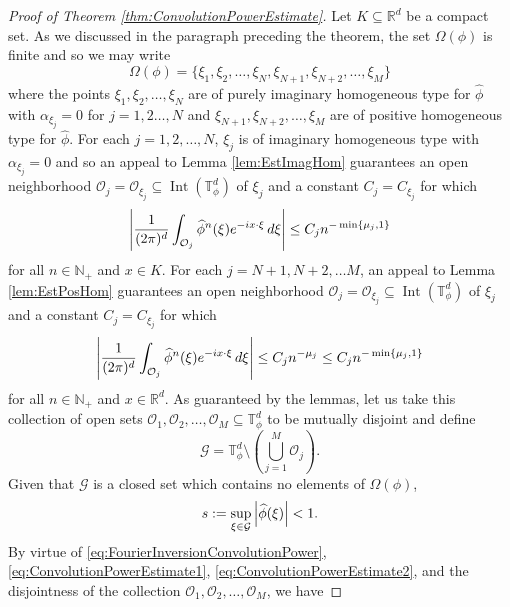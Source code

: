 \documentclass[11pt, letter]{book}
\newcommand\Interior{\operatorname{Int}}
\begin{document}
\begin{proof}[Proof of Theorem \ref{thm:ConvolutionPowerEstimate}]
Let $K\subseteq\mathbb{R}^d$ be a compact set. As we discussed in the paragraph preceding the theorem, the set $\Omega(\phi)$ is finite and so we may write
\begin{equation*}
    \Omega(\phi)=\{\xi_1,\xi_2,\dots,\xi_N,\xi_{N+1},\xi_{N+2},\dots,\xi_M\}
\end{equation*}
where the points $\xi_1,\xi_2,\dots,\xi_N$ are of purely imaginary homogeneous type for $\widehat{\phi}$ with $\alpha_{\xi_j}=0$ for $j=1,2\dots,N$ and $\xi_{N+1},\xi_{N+2},\dots,\xi_M$ are of positive homogeneous type for $\widehat{\phi}$. For each $j=1,2,\dots,N$, $\xi_j$ is of imaginary homogeneous type with $\alpha_{\xi_j}=0$ and so an appeal to Lemma \ref{lem:EstImagHom} guarantees an open neighborhood $\mathcal{O}_j=\mathcal{O}_{\xi_j}\subseteq\Interior(\mathbb{T}_\phi^d)$ of $\xi_j$ and a constant $C_j=C_{\xi_j}$ for which
\begin{equation}\label{eq:ConvolutionPowerEstimate1}
    \abs{\frac{1}{(2\pi)^d}\int_{\mathcal{O}_j}\widehat{\phi}^n(\xi)e^{-ix\cdot\xi}\,d\xi}\leq C_j n^{-\min\{\mu_j,1\}}
\end{equation}
for all $n\in\mathbb{N}_+$ and $x\in K$. For each $j=N+1,N+2,\dots M$, an appeal to Lemma \ref{lem:EstPosHom} guarantees an open neighborhood $\mathcal{O}_j=\mathcal{O}_{\xi_j}\subseteq\Interior(\mathbb{T}_\phi^d)$ of $\xi_j$ and a constant $C_j=C_{\xi_j}$ for which 
\begin{equation}\label{eq:ConvolutionPowerEstimate2}
        \abs{\frac{1}{(2\pi)^d}\int_{\mathcal{O}_j}\widehat{\phi}^n(\xi)e^{-ix\cdot\xi}\,d\xi}\leq C_jn^{-\mu_j}\leq C_j n^{-\min\{\mu_j,1\}}
\end{equation}
for all $n\in\mathbb{N}_+$ and $x\in\mathbb{R}^d$. As guaranteed by the lemmas, let us take this collection of open sets $\mathcal{O}_1,\mathcal{O}_2,\dots,\mathcal{O}_M\subseteq\mathbb{T}_{\phi}^d$ to be mutually disjoint and define
\begin{equation}
    \mathcal{G}=\mathbb{T}_{\phi}^d\setminus\left(\bigcup_{j=1}^M \mathcal{O}_j\right).
\end{equation}
Given that $\mathcal{G}$ is a closed set which contains no elements of $\Omega(\phi)$,
\begin{equation*}
s:=\sup_{\xi\in\mathcal{G}}\abs{\widehat{\phi}(\xi)}<1.
\end{equation*}
By virtue of \eqref{eq:FourierInversionConvolutionPower}, \eqref{eq:ConvolutionPowerEstimate1}, \eqref{eq:ConvolutionPowerEstimate2}, and the disjointness of the collection $\mathcal{O}_1,\mathcal{O}_2,\dots,\mathcal{O}_M$, we have

\end{proof}
\end{document}
